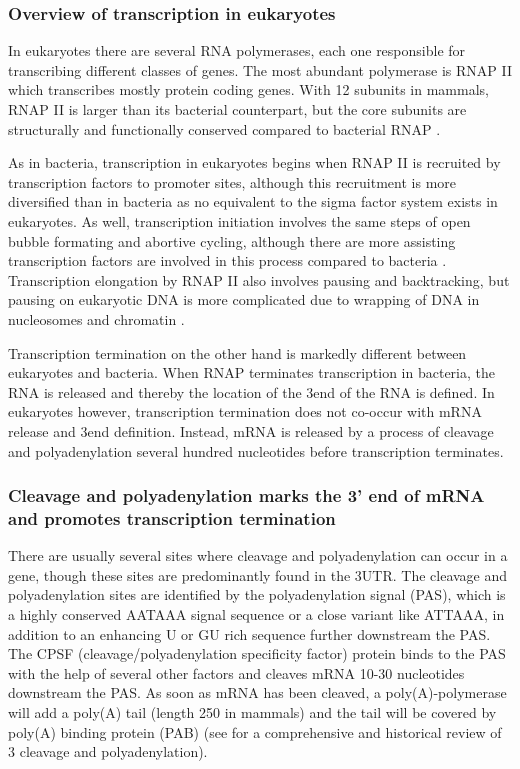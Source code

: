 %
\subsubsection{Overview of transcription in eukaryotes}
In eukaryotes there are several RNA polymerases, each one responsible for
transcribing different classes of genes. The most abundant polymerase is 
RNAP II which transcribes mostly protein coding genes. With 12 subunits in
mammals, RNAP II is larger than its bacterial counterpart, but the core
subunits are structurally and functionally conserved compared to bacterial RNAP
\cite{ebright_rna_2000}.

As in bacteria, transcription in eukaryotes begins when RNAP II is recruited by
transcription factors to promoter sites, although this recruitment is more
diversified than in bacteria as no equivalent to the sigma factor system
exists in eukaryotes. As well, transcription initiation involves the same steps
of open bubble formating and abortive cycling, although there are more
assisting transcription factors are involved in this process compared to
bacteria \cite{wade_transition_2008}. Transcription elongation by RNAP II also
involves pausing and backtracking, but pausing on eukaryotic DNA is more
complicated due to wrapping of DNA in nucleosomes and chromatin
\cite{sims_elongation_2004}.

Transcription termination on the other hand is markedly different between
eukaryotes and bacteria. When RNAP terminates transcription in bacteria, the
RNA is released and thereby the location of the 3\p end of the RNA is defined.
In eukaryotes however, transcription termination does not co-occur with mRNA
release and 3\p end definition. Instead, mRNA is released by a process of
cleavage and polyadenylation several hundred nucleotides before transcription
terminates.

\subsubsection{Cleavage and polyadenylation marks the 3' end of mRNA
and promotes transcription termination}
There are usually several sites where cleavage and polyadenylation can occur in
a gene, though these sites are predominantly found in the 3\p UTR. The cleavage
and polyadenylation sites are identified by the polyadenylation signal (PAS),
which is a highly conserved AATAAA signal sequence or a close variant like
ATTAAA, in addition to an enhancing U or GU rich sequence further downstream
the PAS. The CPSF (cleavage/polyadenylation specificity factor) protein binds
to the PAS with the help of several other factors and cleaves mRNA 10-30
nucleotides downstream the PAS. As soon as mRNA has been cleaved, a
poly(A)-polymerase will add a poly(A) tail (length 250 in mammals) and the tail
will be covered by poly(A) binding protein (PAB) (see
\cite{proudfoot_ending_2011} for a comprehensive and historical review of 3\p
cleavage and polyadenylation).

